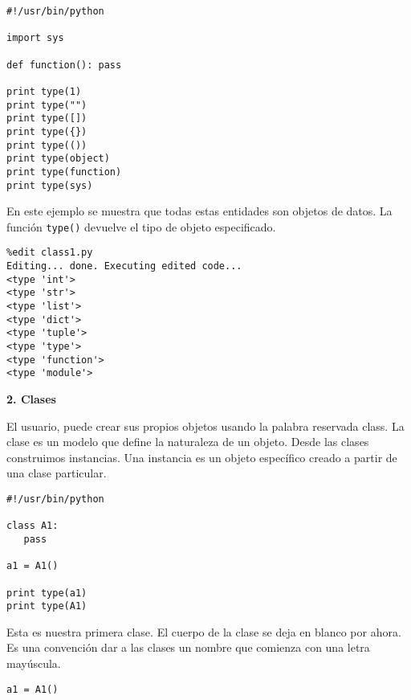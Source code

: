 \documentclass[twoside,10.5pt]{article}%
\begin{document}
\begin{verbatim}
#!/usr/bin/python

import sys

def function(): pass

print type(1)
print type("")
print type([])
print type({})
print type(())
print type(object)
print type(function)
print type(sys)
\end{verbatim}

\vspace{0.3cm}


En este ejemplo se muestra que todas estas entidades son objetos de datos. La funci\'on \texttt{type()} devuelve el tipo de objeto especificado.

\vspace{0.3cm}

\begin{verbatim}
%edit class1.py
Editing... done. Executing edited code...
<type 'int'>
<type 'str'>
<type 'list'>
<type 'dict'>
<type 'tuple'>
<type 'type'>
<type 'function'>
<type 'module'>
\end{verbatim}

\vspace{0.3cm}

\textbf{2. Clases}

El usuario, puede crear sus propios objetos usando la palabra reservada {\color{red} class}. La clase es un modelo que define la naturaleza  de un objeto. Desde las clases construimos {\color{red}instancias}. Una instancia es un objeto espec\'ifico creado a partir de una clase particular.

\vspace{0.3cm}

\begin{verbatim}
#!/usr/bin/python

class A1:
   pass

a1 = A1()

print type(a1)
print type(A1)
\end{verbatim}

\vspace{0.3cm}

Esta es nuestra primera clase. El cuerpo de la clase se deja en blanco por ahora. Es una convenci\'on  dar a las clases un nombre que comienza con una letra may\'uscula.

\vspace{0.3cm}

\begin{verbatim}
a1 = A1()
\end{verbatim}
\end{document}
